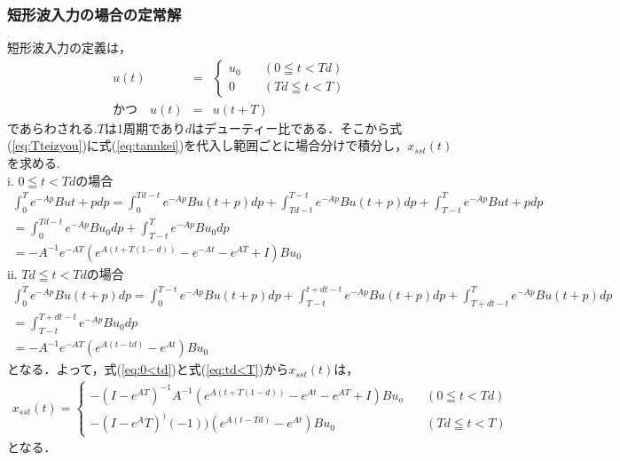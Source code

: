 \documentclass[12pt]{jarticle}
\begin{document}
\subsubsection{短形波入力の場合の定常解}
短形波入力の定義は，
\begin{eqnarray}
u(t ) &=& 
\begin{cases}
u_0 \quad &(0\leqq t <Td)  \\
0 \quad &(Td\leqq t <T) 
\end{cases}
\nonumber
\\
\label{eq:tannkei}
かつ\quad u(t)&=&u(t+T)
\end{eqnarray}
であらわされる.$T$は1周期であり$d$はデューティー比である．そこから式(\ref{eq:Tteizyou})に式(\ref{eq:tannkei})を代入し範囲ごとに場合分けで積分し，$x_{sst}(t)$を求める.
\\ \qquad i. $0\leqq t<Tdの場合$
\begin{gather}
\int_{0}^{T}e^{-Ap}Bu{t+p}dp=\int_{0}^{Td-t}e^{-Ap}Bu(t+p)dp+\int_{Td-t}^{T-t}e^{-Ap}Bu(t+p)dp+\int_{T-t}^{T}e^{-Ap}Bu{t+p}dp\nonumber \\
=\int_{0}^{Td-t}e^{-Ap}Bu_0dp+\int_{T-t}^{T}e^{-Ap}Bu_0dp \nonumber \\ 
=-A^{-1}e^{-AT}(e^{A(t+T(1-d))}-e^{-At}-e^{AT}+I)Bu_0
\label{eq:0<td}
\end{gather}
\qquad ii. $Td \leqq t <Tdの場合$
\begin{gather}
\int_{0}^{T}e^{-Ap}Bu(t+p)dp=\int_{0}^{T-t}e^{-Ap}Bu(t+p)dp+\int_{T-t}^{t+dt-t}e^{-Ap}Bu(t+p)dp+\int_{T+dt-t}^{T}e^{-Ap}
Bu(t+p)dp \nonumber\\
=\int_{T-t}^{T+dt-t}e^{-Ap}Bu_0dp \nonumber\\
=-A^{-1}e^{-AT}(e^{A(t-td)}-e^{At})Bu_0
\label{eq:td<T}
\end{gather}
となる．よって，式(\ref{eq:0<td})と式(\ref{eq:td<T})から$x_{sst}(t)$は，
\begin{eqnarray}
x_{sst}(t)=
\begin{cases}
	-(I-e^{AT})^{-1}A^{-1}(e^{A(t+T(1-d))}-e^{At}-e^{AT}+I)Bu_o &\quad (0\leqq t <Td)\\
	-(I-e^AT)^)(-1))(e^{A(t-Td)}-e^{At})Bu_0 & \quad(Td\leqq t <T)
	\label{eq:tannkei}
\end{cases} 
\end{eqnarray}
となる．
\end{document}
